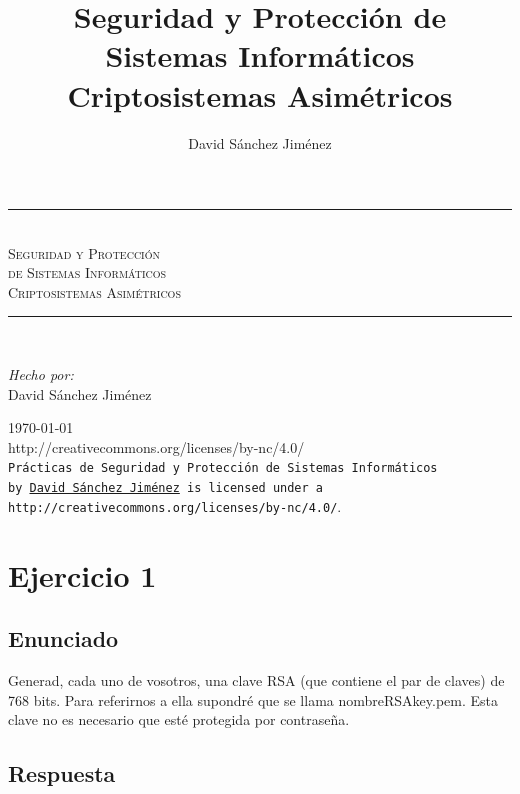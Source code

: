 \documentclass[10pt,a4paper,spanish]{report}
\title{Seguridad y Protección de Sistemas Informáticos \\
Criptosistemas Asimétricos}
\author{David Sánchez Jiménez}
\newcommand{\HRule}{\rule{\linewidth}{0.5mm}} %
\begin{document}
\begin{titlepage}
 \begin{center}
  \HRule \\[0.8cm]
  \textsc{\huge Seguridad y Protección \\ de Sistemas Informáticos \\[0.5cm] Criptosistemas Asimétricos}\\[1.6cm]
  \HRule \\[1cm]
  \begin{flushleft}
   \emph{Hecho por:}\\
   David Sánchez Jiménez
  \end{flushleft}
  \vspace{12cm}
  \large{\today}\\
  \vspace{0.5cm}
  {http://creativecommons.org/licenses/by-nc/4.0/}\\[0.5cm]
  \texttt{Prácticas de Seguridad y Protección de Sistemas Informáticos\\ by
   \href{mailto:dasaji92@gmail.com}{David Sánchez Jiménez} is licensed under a 
   {http://creativecommons.org/licenses/by-nc/4.0/}}.\\[3mm]
 \end{center}
\end{titlepage}

\tableofcontents
\newpage

\chapter{Ejercicio 1}

\section{Enunciado}
\noindent
Generad, cada uno de vosotros, una clave RSA (que contiene el par de claves) de 768 bits. Para referirnos a ella supondré que se llama nombreRSAkey.pem. Esta clave no es necesario que esté protegida por contraseña.

\section{Respuesta}
\noindent
\end{document}
